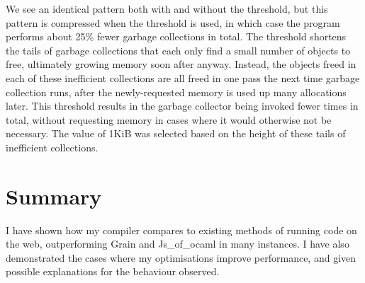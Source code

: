 We see an identical pattern both with and without the threshold, but this pattern is compressed when the threshold is used, in which case the program performs about 25\% fewer garbage collections in total.  The threshold shortens the tails of garbage collections that each only find a small number of objects to free, ultimately growing memory soon after anyway. Instead, the objects freed in each of these inefficient collections are all freed in one pass the next time garbage collection runs, after the newly-requested memory is used up many allocations later. This threshold results in the garbage collector being invoked fewer times in total, without requesting memory in cases where it would otherwise not be necessary. The value of 1KiB was selected based on the height of these tails of inefficient collections.

\section{Summary}
I have shown how my compiler compares to existing methods of running code on the web, outperforming Grain and Js\_of\_ocaml in many instances. I have also demonstrated the cases where my optimisations improve performance, and given possible explanations for the behaviour observed.












